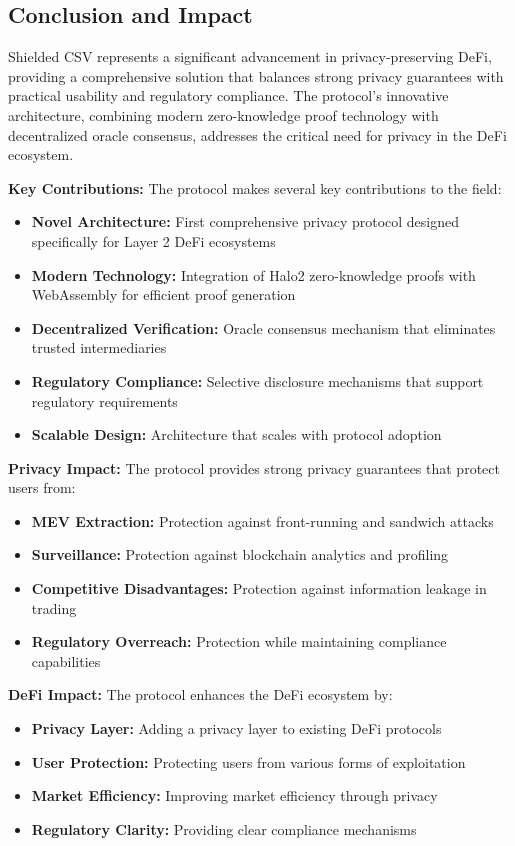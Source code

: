 \documentclass[11pt,a4paper]{article}
\begin{document}
\subsection{Conclusion and Impact}

Shielded CSV represents a significant advancement in privacy-preserving DeFi, providing a comprehensive solution that balances strong privacy guarantees with practical usability and regulatory compliance. The protocol's innovative architecture, combining modern zero-knowledge proof technology with decentralized oracle consensus, addresses the critical need for privacy in the DeFi ecosystem.

\textbf{Key Contributions:}
The protocol makes several key contributions to the field:
\begin{itemize}
    \item \textbf{Novel Architecture:} First comprehensive privacy protocol designed specifically for Layer 2 DeFi ecosystems
    \item \textbf{Modern Technology:} Integration of Halo2 zero-knowledge proofs with WebAssembly for efficient proof generation
    \item \textbf{Decentralized Verification:} Oracle consensus mechanism that eliminates trusted intermediaries
    \item \textbf{Regulatory Compliance:} Selective disclosure mechanisms that support regulatory requirements
    \item \textbf{Scalable Design:} Architecture that scales with protocol adoption
\end{itemize}

\textbf{Privacy Impact:}
The protocol provides strong privacy guarantees that protect users from:
\begin{itemize}
    \item \textbf{MEV Extraction:} Protection against front-running and sandwich attacks
    \item \textbf{Surveillance:} Protection against blockchain analytics and profiling
    \item \textbf{Competitive Disadvantages:} Protection against information leakage in trading
    \item \textbf{Regulatory Overreach:} Protection while maintaining compliance capabilities
\end{itemize}

\textbf{DeFi Impact:}
The protocol enhances the DeFi ecosystem by:
\begin{itemize}
    \item \textbf{Privacy Layer:} Adding a privacy layer to existing DeFi protocols
    \item \textbf{User Protection:} Protecting users from various forms of exploitation
    \item \textbf{Market Efficiency:} Improving market efficiency through privacy
    \item \textbf{Regulatory Clarity:} Providing clear compliance mechanisms
\end{itemize}
\end{document}
